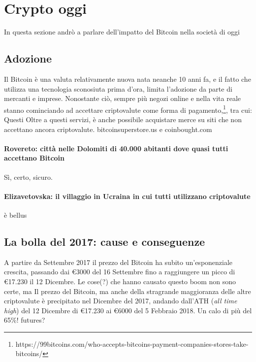 \documentclass {article}
\begin{document}
{\section {Crypto oggi}


In questa sezione andrò a parlare dell'impatto del Bitcoin nella società di oggi


\subsection {Adozione}


Il Bitcoin è una valuta relativamente nuova nata neanche 10 anni fa, e il fatto che utilizza una tecnologia sconosiuta prima d'ora, limita l'adozione da parte di mercanti e imprese.
Nonostante ciò, sempre più negozi online e nella vita reale stanno cominciando ad accettare criptovalute come forma di pagamento,\footnote{https://99bitcoins.com/who-accepts-bitcoins-payment-companies-stores-take-bitcoins/}, tra cui:
Questi 
Oltre a questi servizi, è anche possibile acquistare merce su siti che non accettano ancora criptovalute. bitcoinsuperstore.us e coinbought.com


\paragraph {Rovereto: città nelle Dolomiti di 40.000 abitanti dove quasi tutti accettano Bitcoin}


Sì, certo, sicuro.


\paragraph {Elizavetovska: il villaggio in Ucraina in cui tutti utilizzano criptovalute}


è bellus


\subsection {La bolla del 2017: cause e conseguenze}


A partire da Settembre 2017 il prezzo del Bitcoin ha subito un'esponenziale crescita, passando dai \euro{3000} del 16 Settembre fino a raggiungere un picco di \euro{17.230} il 12 Dicembre.
Le cose(?) che hanno causato questo boom non sono certe, ma
Il prezzo del Bitcoin, ma anche della stragrande maggioranza delle altre criptovalute è precipitato nel Dicembre del 2017, andando dall'ATH (\textit{all time high}) del 12 Dicembre di \euro{17.230} ai \euro{6000} del 5 Febbraio 2018. Un calo di più del 65\%!
futures?


}
\end{document}
